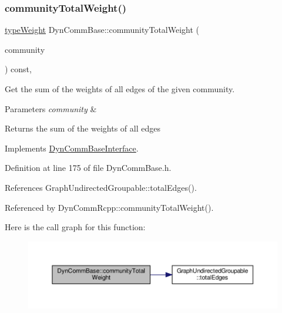 \subsubsection{\texorpdfstring{community\+Total\+Weight()}{communityTotalWeight()}}
{\footnotesize\ttfamily \hyperlink{edge_8h_a2e7ea3be891ac8b52f749ec73fee6dd2}{type\+Weight} Dyn\+Comm\+Base\+::community\+Total\+Weight (\begin{DoxyParamCaption}\item[{\hyperlink{graphUndirectedGroupable_8h_a914da95c9ea7f14f4b7f875c36818556}{type\+Community}}]{community }\end{DoxyParamCaption}) const\hspace{0.3cm}{\ttfamily [inline]}, {\ttfamily [virtual]}}

Get the sum of the weights of all edges of the given community.


\begin{DoxyParams}{Parameters}
{\em community} & \\
\hline
\end{DoxyParams}
\begin{DoxyReturn}{Returns}
the sum of the weights of all edges 
\end{DoxyReturn}


Implements \hyperlink{classDynCommBaseInterface_a06e0b8a06e9c1067e12f574458db3eb0}{Dyn\+Comm\+Base\+Interface}.



Definition at line 175 of file Dyn\+Comm\+Base.\+h.



References Graph\+Undirected\+Groupable\+::total\+Edges().



Referenced by Dyn\+Comm\+Rcpp\+::community\+Total\+Weight().

Here is the call graph for this function\+:
\nopagebreak
\begin{figure}[H]
\begin{center}
\leavevmode
\includegraphics[width=350pt]{classDynCommBase_a9e7f2493dd9f2381dbfbe94b91ac49f4_cgraph}
\end{center}
\end{figure}
\mbox{\label{classDynCommBase_ad02f1853b63e1ceaf24b05cfdbcf7a49}} 
